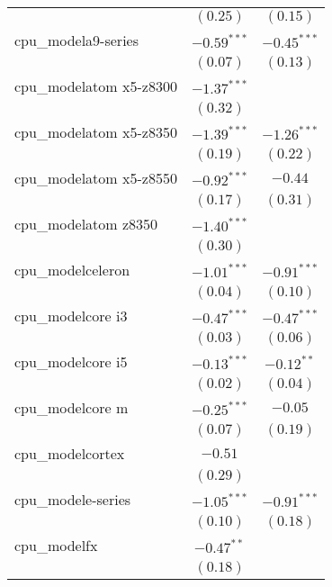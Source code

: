 \documentclass[
]{article}
\begin{document}
\begin{table}
\begin{center}
\begin{tabular}{l c c}
                              & $(0.25)$      & $(0.15)$      \\
cpu\_modela9-series           & $-0.59^{***}$ & $-0.45^{***}$ \\
                              & $(0.07)$      & $(0.13)$      \\
cpu\_modelatom x5-z8300       & $-1.37^{***}$ &               \\
                              & $(0.32)$      &               \\
cpu\_modelatom x5-z8350       & $-1.39^{***}$ & $-1.26^{***}$ \\
                              & $(0.19)$      & $(0.22)$      \\
cpu\_modelatom x5-z8550       & $-0.92^{***}$ & $-0.44$       \\
                              & $(0.17)$      & $(0.31)$      \\
cpu\_modelatom z8350          & $-1.40^{***}$ &               \\
                              & $(0.30)$      &               \\
cpu\_modelceleron             & $-1.01^{***}$ & $-0.91^{***}$ \\
                              & $(0.04)$      & $(0.10)$      \\
cpu\_modelcore i3             & $-0.47^{***}$ & $-0.47^{***}$ \\
                              & $(0.03)$      & $(0.06)$      \\
cpu\_modelcore i5             & $-0.13^{***}$ & $-0.12^{**}$  \\
                              & $(0.02)$      & $(0.04)$      \\
cpu\_modelcore m              & $-0.25^{***}$ & $-0.05$       \\
                              & $(0.07)$      & $(0.19)$      \\
cpu\_modelcortex              & $-0.51$       &               \\
                              & $(0.29)$      &               \\
cpu\_modele-series            & $-1.05^{***}$ & $-0.91^{***}$ \\
                              & $(0.10)$      & $(0.18)$      \\
cpu\_modelfx                  & $-0.47^{**}$  &               \\
                              & $(0.18)$      &               \\

\end{tabular}
\end{center}
\end{table}
\end{document}
